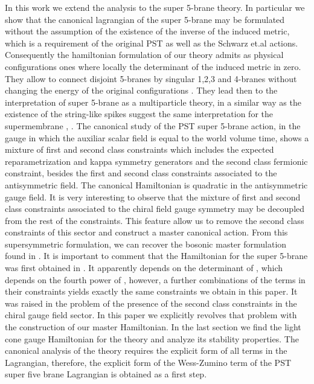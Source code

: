 \documentclass[a4paper,12pt]{article}
\def\CH{\widetilde{\cal{H}}}
\begin{document}
In this work we extend the analysis to the super 5-brane theory.
In particular we show that the canonical lagrangian of the super
5-brane may be formulated without the assumption of the existence
of the inverse of the induced metric, which is a requirement of
the original PST as well as the Schwarz  et.al actions.
Consequently the hamiltonian formulation of our theory admits as
physical configurations ones where locally the determinant of the
induced metric in zero. They allow to connect disjoint 5-branes by
singular 1,2,3 and 4-branes without changing the energy of the
original configurations . They lead then to the interpretation of
super 5-brane as a multiparticle theory, in a similar way as the
existence of the string-like spikes suggest the same
interpretation for the supermembrane \cite{deWit:1989ct},
\cite{Nicolai:1998ic}. The canonical study of the  PST super
5-brane action, in the gauge in which the  auxiliar scalar field
is equal to the world volume time, shows a mixture of first and
second class constraints which includes the expected
reparametrization and kappa symmetry generators and the second
class fermionic constraint, besides the first and second class
constraints associated to the antisymmetric field. The canonical
Hamiltonian is quadratic in the antisymmetric gauge field. It is
very interesting to observe that the mixture of first and second
class constraints associated to the  chiral field gauge symmetry
may be decoupled from the rest of the constraints. This feature
allow us to remove the second class constraints of this sector and
construct a master canonical action. From this supersymmetric
formulation, we can recover the bosonic master formulation found
in \cite{DeCastro:2001gp}. It is important to comment that the
Hamiltonian for the super 5-brane was first obtained in
\cite{Bergshoeff:1998vx} . It apparently depends on the
determinant of \myHighlight{$(g+\CH)$}\coordHE{}, which depends on the fourth power of
\myHighlight{$\CH$}\coordHE{}, however, a further combinations of the terms in their
constraints yields exactly the same constraints we  obtain in this
paper. It was raised in \cite{Bergshoeff:1998vx} the problem of
the presence of the second class constraints in the chiral gauge
field sector. In this paper we explicitly revolves that problem
with the construction of our master Hamiltonian. In the last
section we find the light cone gauge Hamiltonian for the theory
and analyze its stability properties. The canonical analysis of
the theory requires the explicit form of all terms in the
Lagrangian, therefore, the explicit form of the Wess-Zumino term
of the PST \cite{Pasti2} super five brane Lagrangian is obtained
as a first step.
\end{document}
